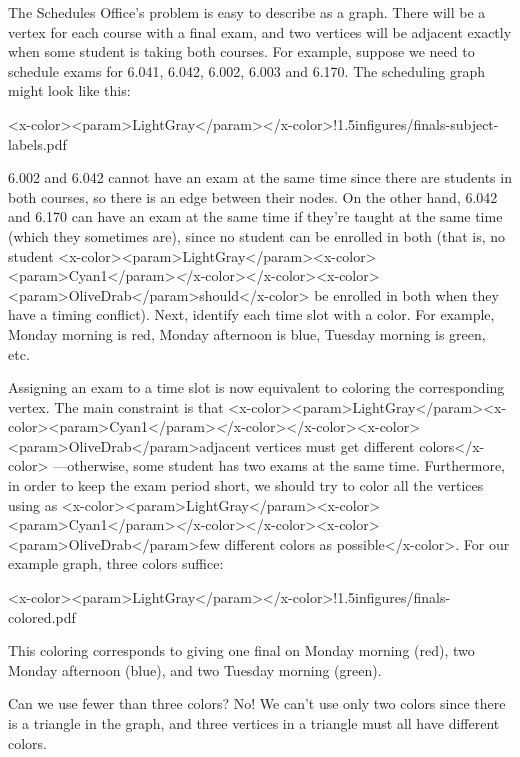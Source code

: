 {The Schedules Office's problem is easy to describe as a graph.  There
will be a vertex for each course with a final exam, and two vertices will
be adjacent exactly when some student is taking both courses.  For
example, suppose we need to schedule exams for 6.041, 6.042, 6.002, 6.003
and 6.170.  The scheduling graph might look like this:

<x-color><param>LightGray</param>\mfigure</x-color>{!}{1.5in}{figures/finals-subject-labels.pdf}

6.002 and 6.042 cannot have an exam at the same time since there are
students in both courses, so there is an edge between their nodes.  On the
other hand, 6.042 and 6.170 can have an exam at the same time if they're
taught at the same time (which they sometimes are), since no student can
be enrolled in both (that is, no student <x-color><param>LightGray</param><x-color><param>Cyan1</param>\emph</x-color></x-color><x-color><param>OliveDrab</param>{should}</x-color> be enrolled in both
when they have a timing conflict).  Next, identify each time slot with a
color.  For example, Monday morning is red, Monday afternoon is blue,
Tuesday morning is green, etc.

Assigning an exam to a time slot is now equivalent to coloring the
corresponding vertex.  The main constraint is that <x-color><param>LightGray</param><x-color><param>Cyan1</param>\emph</x-color></x-color><x-color><param>OliveDrab</param>{adjacent vertices
  must get different colors}</x-color> ---otherwise, some student has two exams at
the same time.  Furthermore, in order to keep the exam period short, we
should try to color all the vertices using as <x-color><param>LightGray</param><x-color><param>Cyan1</param>\emph</x-color></x-color><x-color><param>OliveDrab</param>{few different colors
  as possible}</x-color>.  For our example graph, three colors suffice:

<x-color><param>LightGray</param>\mfigure</x-color>{!}{1.5in}{figures/finals-colored.pdf}

This coloring corresponds to giving one final on Monday morning (red),
two Monday afternoon (blue), and two Tuesday morning (green).

Can we use fewer than three colors?  No! We can't use only two colors
since there is a triangle in the graph, and three vertices in a triangle
must all have different colors.

}
